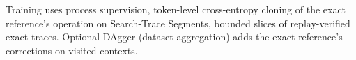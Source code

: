 Training uses process supervision, token-level cross-entropy cloning of the exact reference's operation on Search-Trace Segments, bounded slices of replay-verified exact traces. Optional DAgger (dataset aggregation) \citep{ross2011dagger} adds the exact reference's corrections on visited contexts.
